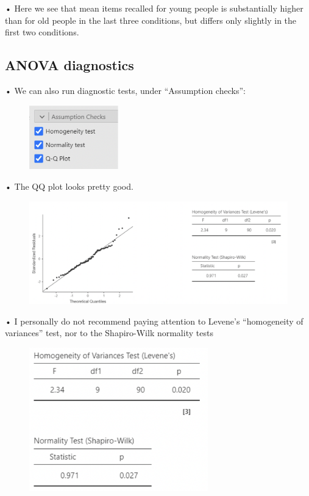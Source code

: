 \documentclass[
  letterpaper,
  DIV=11,
  numbers=noendperiod]{scrreprt}
\begin{document}
• Here we see that mean items recalled for young people is substantially
higher than for old people in the last three conditions, but differs
only slightly in the first two conditions.

\hypertarget{anova-diagnostics}{%
\subsection{ANOVA diagnostics}\label{anova-diagnostics}}

• We can also run diagnostic tests, under ``Assumption checks'':

\begin{figure}

\includegraphics[width=1.52083in,height=\textheight]{images/Mod5_8.png} \hfill{}

\end{figure}

• The QQ plot looks pretty good.

\begin{figure}

{\centering \includegraphics{images/Mod5_9.png}

}

\end{figure}

• I personally do not recommend paying attention to Levene's
``homogeneity of variances'' test, nor to the Shapiro-Wilk normality
tests

\begin{figure}

{\centering \includegraphics[width=3.05208in,height=\textheight]{images/Mod5_10.png}

}

\end{figure}
\end{document}
